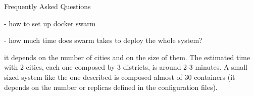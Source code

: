 Frequently Asked Questions

- how to set up docker swarm

- how much time does swarm takes to deploy the whole system?

it depends on the number of cities and on the size of them.
The estimated time with 2 cities, each one
composed by 3 districts, is around 2-3 minutes. A small sized system like
the one described is composed almost of 30 containers (it depends on the
number or replicas defined in the configuration files).